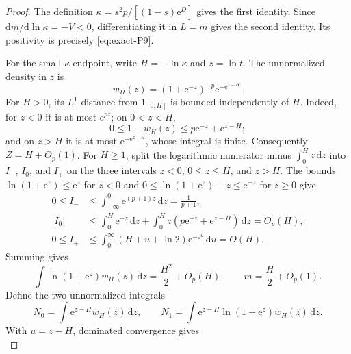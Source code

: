 \begin{proof} The definition \(\kappa=s^2p/[(1-s)\mathrm{e}^D]\) gives the first identity. Since \(\mathrm{d}m/\mathrm{d}\ln\kappa=-V<0\), differentiating it in \(L=m\) gives the second identity. Its positivity is precisely \eqref{eq:exact-P9}.

For the small-\(\kappa\) endpoint, write \(H=-\ln\kappa\) and \(z=\ln t\). The unnormalized density in \(z\) is
\begin{equation}
 w_H(z)=(1+\mathrm{e}^{-z})^{-p}\mathrm{e}^{-\mathrm{e}^{z-H}}.
\end{equation}
For \(H>0\), its \(L^1\) distance from \(1_{[0,H]}\) is bounded independently of \(H\). Indeed, for \(z<0\) it is at most \(\mathrm{e}^{pz}\); on \(0<z<H\),
\begin{equation}
 0\le1-w_H(z)\le p \mathrm{e}^{-z}+\mathrm{e}^{z-H};
\end{equation}
and on \(z>H\) it is at most \(\mathrm{e}^{-\mathrm{e}^{z-H}}\), whose integral is finite. Consequently \(Z=H+O_p(1)\). For $H\geq1$, split the logarithmic numerator minus $\int_0^H z\,\mathrm{d}z$ into $I_-$, $I_0$, and $I_+$ on the three intervals $z<0$, $0\leq z\leq H$, and $z>H$. The bounds $\ln(1+\mathrm{e}^z)\leq\mathrm{e}^z$ for $z<0$ and $0\leq\ln(1+\mathrm{e}^z)-z\leq\mathrm{e}^{-z}$ for $z\geq0$ give
\begin{equation}
 \begin{split}
 0\leq I_-&\leq\int_{-\infty}^0\mathrm{e}^{(p+1)z}\,\mathrm{d}z=\frac1{p+1},\\
 |I_0|&\leq\int_0^H\mathrm{e}^{-z}\,\mathrm{d}z
 +\int_0^H z(p\mathrm{e}^{-z}+\mathrm{e}^{z-H})\,\mathrm{d}z=O_p(H),\\
 0\leq I_+&\leq\int_0^\infty(H+u+\ln2)\mathrm{e}^{-\mathrm{e}^u}\,\mathrm{d}u=O(H).
 \end{split}\label{eq:exact-plateau-bounds}
\end{equation}
Summing gives
\begin{equation}
 \int\ln(1+\mathrm{e}^z)w_H(z)\,\mathrm{d}z=\frac{H^2}{2}+O_p(H),
 \qquad m=\frac H2+O_p(1).                            \label{eq:exact-P17}
\end{equation}
Define the two unnormalized integrals
\begin{equation}
 N_0=\int \mathrm{e}^{z-H}w_H(z)\,\mathrm{d}z,\qquad
 N_1=\int \mathrm{e}^{z-H}\ln(1+\mathrm{e}^z)w_H(z)\,\mathrm{d}z.
\end{equation}
With \(u=z-H\), dominated convergence gives
\begin{equation}

\end{equation}
\end{proof}
